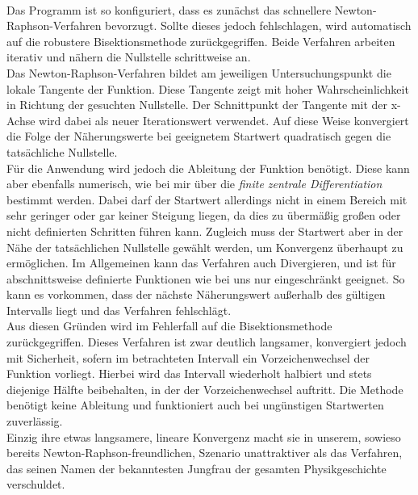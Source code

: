 \\
Das Programm ist so konfiguriert, dass es zunächst das schnellere Newton-Raphson-Verfahren bevorzugt. 
Sollte dieses jedoch fehlschlagen, wird automatisch auf die robustere Bisektionsmethode zurückgegriffen. 
Beide Verfahren arbeiten iterativ und nähern die Nullstelle schrittweise an.
\\
Das Newton-Raphson-Verfahren\parencite{NewtonRaphsonWiki} bildet am jeweiligen Untersuchungspunkt die lokale Tangente der Funktion. 
Diese Tangente zeigt mit hoher Wahrscheinlichkeit in Richtung der gesuchten Nullstelle. 
Der Schnittpunkt der Tangente mit der x-Achse wird dabei als neuer Iterationswert verwendet. 
Auf diese Weise konvergiert die Folge der Näherungswerte bei geeignetem Startwert quadratisch gegen die tatsächliche Nullstelle.
\\
Für die Anwendung wird jedoch die Ableitung der Funktion benötigt. 
Diese kann aber ebenfalls numerisch, wie bei mir über die \textit{finite zentrale Differentiation}\parencite{FiniteDifferenzWiki} bestimmt werden. 
Dabei darf der Startwert allerdings nicht in einem Bereich mit sehr geringer oder gar keiner Steigung liegen, da dies zu übermäßig großen oder nicht definierten Schritten führen kann. 
Zugleich muss der Startwert aber in der Nähe der tatsächlichen Nullstelle gewählt werden, um Konvergenz überhaupt zu ermöglichen. 
Im Allgemeinen kann das Verfahren auch Divergieren, und ist für abschnittsweise definierte Funktionen wie bei uns nur eingeschränkt geeignet. So kann es vorkommen, dass der nächste Näherungswert außerhalb des gültigen Intervalls liegt und das Verfahren fehlschlägt.
\\
Aus diesen Gründen wird im Fehlerfall auf die Bisektionsmethode\parencite{BisektionWiki} zurückgegriffen. 
Dieses Verfahren ist zwar deutlich langsamer, konvergiert jedoch mit Sicherheit, sofern im betrachteten Intervall ein Vorzeichenwechsel der Funktion vorliegt. 
Hierbei wird das Intervall wiederholt halbiert und stets diejenige Hälfte beibehalten, in der der Vorzeichenwechsel auftritt. 
Die Methode benötigt keine Ableitung und funktioniert auch bei ungünstigen Startwerten zuverlässig. 
\\
Einzig ihre etwas langsamere, lineare Konvergenz macht sie in unserem, sowieso bereits Newton-Raphson-freundlichen, Szenario unattraktiver als das Verfahren, das seinen Namen der bekanntesten Jungfrau der gesamten Physikgeschichte verschuldet.






